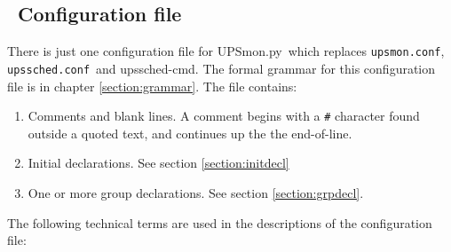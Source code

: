\documentclass[12pt]{article}
\newlength{\headersep}\setlength{\headersep}{3mm}
\newcommand{\Hsep}{\hspace{\headersep}}
\newcommand{\upsschedcmd}{\mbox{\textcolor{CMDCOLOUR}{upssched-cmd}}}
\newcommand{\UPSmon}{\mbox{\textcolor{UPSMONCOLOUR}{UPSmon.py}}}
\newcommand{\upsmonconf}{\textcolor{MONCOLOUR}{\texttt{upsmon.conf}}}
\newcommand{\upsschedconf}{\textcolor{SCHEDCOLOUR}{\texttt{upssched.conf}}}
\newcommand{\ol}{\begin{enumerate}%
   \setlength{\itemsep}{0em}}
\newcommand{\eol}{\end{enumerate}}
\newcommand{\li}{\item}                 %
\begin{document}
\subsection{\Hsep\ Configuration file}\label{section:UPSmonconffile}

There is just one configuration file for \UPSmon\ which replaces \upsmonconf,
\upsschedconf\ and \upsschedcmd.  The formal grammar for this configuration
file is in chapter \ref{section:grammar}.  The file contains:

\ol

\li Comments and blank lines.  A comment begins with a \texttt{\#} character
found outside a quoted text, and continues up the the end-of-line.

\li Initial declarations.  See section \ref{section:initdecl}

\li One or more group declarations.  See section \ref{section:grpdecl}.

\eol

The following technical terms are used in the descriptions of the
configuration file:
\end{document}
